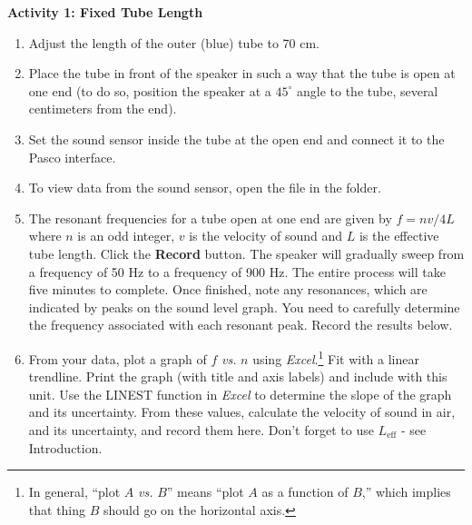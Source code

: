 \textbf{Activity 1: Fixed Tube Length} 
\begin{enumerate}[labparts]



\item Adjust the length of the outer (blue) tube to 70 cm.

\item Place the tube in front of the speaker in such a way that the tube is open at one end (to do so, position the speaker at a $45^\circ$ angle to the tube, several centimeters from the end).

\item Set the sound sensor inside the tube at the open end and connect it to the Pasco interface.

\item To view data from the sound sensor, open the file  in the \filename{\coursefolder} folder.  


\item The resonant frequencies for a tube open at one end are given by $f=nv/4L$ where $n$ is an odd integer, $v$ is the velocity of sound and $L$ is the effective tube length. Click the \textbf{Record} button. The speaker will gradually sweep from a frequency of 50 Hz to a frequency of 900 Hz. The entire process will take five minutes to complete. Once finished, note any resonances, which are indicated by peaks on the sound level graph. You need to carefully determine the frequency associated with each resonant peak.  Record the results below.
\vspace*{\fill}

\item From your data, plot a graph of $f$ \textit{vs.} $n$ using \textit{Excel}.\footnote{In general, ``plot $A$ \textit{vs.} $B$'' means ``plot $A$ as a function of $B$,'' which implies that thing $B$ should go on the horizontal axis.} Fit with a linear trendline. Print the graph (with title and axis labels) and include with this unit. Use the LINEST function in \textit{Excel} to determine the slope of the graph and its uncertainty. From these values, calculate the velocity of sound in air, and its uncertainty, and record them here. Don't forget to use $L_{\mathrm{eff}}$ - see Introduction.
\vspace{10mm}

\end{enumerate}

